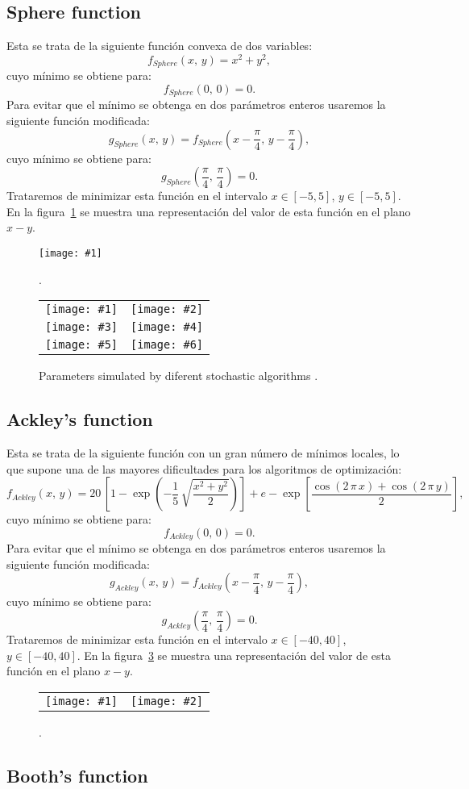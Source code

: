 \documentclass[review,authoryear]{elsarticle}
\newcommand{\EQ}[2]
{\begin{equation}#1\label{#2}\end{equation}}
\newcommand{\PLOT}[3]
{
	\begin{figure}[ht!]
		\centering
		\texttt{[image: \#1]}
		\caption{#2.\label{#3}}
	\end{figure}
}
\newcommand{\PLOTII}[4]
{
	\begin{figure}[ht!]
		\centering
		\begin{tabular}{cc}
			\texttt{[image: \#1]} & \texttt{[image: \#2]}
		\end{tabular}
		\caption{#3.\label{#4}}
	\end{figure}
}
\newcommand{\FIGVI}[8]
{
	\begin{figure}[ht!]
		\centering
		\begin{tabular}{cc}
			\texttt{[image: \#1]} & \texttt{[image: \#2]} \\
			\texttt{[image: \#3]} & \texttt{[image: \#4]} \\
			\texttt{[image: \#5]} & \texttt{[image: \#6]}
		\end{tabular}
		\caption{#7.\label{#8}}
	\end{figure}
}
\newcommand{\C}[1]{\left[#1\right]}
\newcommand{\PA}[1]{\left(#1\right)}
\begin{document}
\subsection{Sphere function}

Esta se trata de la siguiente función convexa de dos variables:
\EQ{f_{Sphere}(x,\,y)=x^2+y^2,}{EqFSphere}
cuyo mínimo se obtiene para:
\EQ{f_{Sphere}(0,\,0)=0.}{EqFSphereM}
Para evitar que el mínimo se obtenga en dos parámetros enteros usaremos la
siguiente función modificada:
\EQ{g_{Sphere}(x,\,y)=f_{Sphere}\PA{x-\frac{\pi}{4},\,y-\frac{\pi}{4}},}
{EqGSphere}
cuyo mínimo se obtiene para:
\EQ{g_{Sphere}\PA{\frac{\pi}{4},\,\frac{\pi}{4}}=0.}{EqGSphereM}
Trataremos de minimizar esta función en el intervalo $x\in[-5,5]$, $y\in[-5,5]$.
En la figura~\ref{FigSphere} se muestra una representación del valor de esta
función en el plano $x-y$.
\PLOT{Sphere.eps}{}{FigSphere}

\FIGVI{sphere-variables-sw-50-50-1.eps}{sphere-variables-mc-2500-1.eps}
{sphere-variables-sw-10-10-25-10-0.5.eps}
{sphere-variables-mc-100-25-10-0.1.eps}
{sphere-variables-ga-250-16-0.2-0.2-0.2-32.eps}
{sphere-variables-ga-100-33-0.25-0.25-0.25-32.eps}
{
	Parameters simulated by diferent stochastic algorithms
}{FigSphereStochasticParameters}

\subsection{Ackley's function}

Esta se trata de la siguiente función con un gran número de mínimos locales, lo
que supone una de las mayores dificultades para los algoritmos de optimización:
\EQ
{
	f_{Ackley}(x,\,y)=20\,\C{1-\exp\PA{-\frac15\,\sqrt{\frac{x^2+y^2}{2}}}}
	+e-\exp\C{\frac{\cos(2\,\pi\,x)+\cos(2\,\pi\,y)}{2}},
}{EqFAckley}
cuyo mínimo se obtiene para:
\EQ{f_{Ackley}(0,\,0)=0.}{EqFAckleyM}
Para evitar que el mínimo se obtenga en dos parámetros enteros usaremos la
siguiente función modificada:
\EQ{g_{Ackley}(x,\,y)=f_{Ackley}\PA{x-\frac{\pi}{4},\,y-\frac{\pi}{4}},}
{EqGAckley}
cuyo mínimo se obtiene para:
\EQ{g_{Ackley}\PA{\frac{\pi}{4},\,\frac{\pi}{4}}=0.}{EqGAckleyM}
Trataremos de minimizar esta función en el intervalo $x\in[-40,40]$,
$y\in[-40,40]$.
En la figura~\ref{FigAckley} se muestra una representación del valor de esta
función en el plano $x-y$.
\PLOTII{Ackley.eps}{Ackley2.eps}{}{FigAckley}

\subsection{Booth's function}
\end{document}
